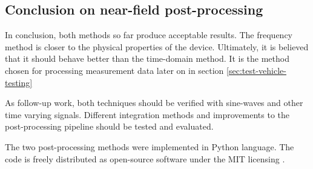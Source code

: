 \subsection{Conclusion on near-field post-processing}

In conclusion, both methods so far produce acceptable results.
The frequency method is closer to the physical properties of the device.
Ultimately, it is believed that it should behave better than the time-domain method.
It is the method chosen for processing measurement data later on in section \ref{sec:test-vehicle-testing}

As follow-up work, both techniques should be verified with sine-waves and other time varying signals.
Different integration methods and improvements to the post-processing pipeline should be tested and evaluated.

The two post-processing methods were implemented in Python language.
The code is freely distributed \cite{nfs-repository} as open-source software under the MIT licensing \cite{mit-licensing}.
